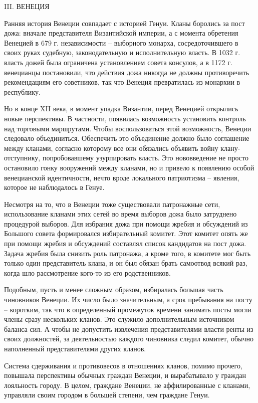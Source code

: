 III. ВЕНЕЦИЯ

Ранняя история Венеции совпадает с историей Генуи. Кланы боролись за пост дожа:
вначале представителя Византийской империи, а с момента обретения Венецией в
679 г. независимости – выборного монарха, сосредоточившего в своих руках
судебную, законодательную и исполнительную власть. В 1032 г. власть дожей была
ограничена установлением совета консулов, а в 1172 г. венецианцы постановили,
что действия дожа никогда не должны противоречить рекомендациям его советников,
так что Венеция превратилась из монархии в республику.

Но в конце XII века, в момент упадка Византии, перед Венецией открылись новые
перспективы. В частности, появилась возможность установить контроль над
торговыми маршрутами. Чтобы воспользоваться этой возможность, Венеции следовало
объединиться. Обеспечить это объединение должно было соглашение между кланами,
согласно которому все они обязались объявить войну клану-отступнику,
попробовавшему узурпировать власть. Это нововведение не просто остановило гонку
вооружений между кланами, но и привело к появлению особой венецианской
идентичности, нечто вроде локального патриотизма – явления, которое не
наблюдалось в Генуе.

Несмотря на то, что в Венеции тоже существовали патронажные сети, использование
кланами этих сетей во время выборов дожа было затруднено процедурой выборов.
Для избрания дожа при помощи жребия и обсуждений из Большого совета
формировался избирательный комитет. Этот комитет опять же при помощи жребия и
обсуждений составлял список кандидатов на пост дожа. Задача жребия была снизить
роль патронажа, а кроме того, в комитете мог быть только один представитель
клана, и он был обязан брать самоотвод всякий раз, когда шло рассмотрение
кого-то из его родственников.

Подобным, пусть и менее сложным образом, избиралась большая часть чиновников
Венеции. Их число было значительным, а срок пребывания на посту – коротким, так
что в определенный промежуток времени занимать посты могли члены сразу
нескольких кланов. Это служило дополнительным источником баланса сил. А чтобы
не допустить извлечения представителями власти ренты из своих должностей, за
деятельностью каждого чиновника следил комитет, обычно наполненный
представителями других кланов.

Система сдерживания и противовесов в отношениях кланов, помимо прочего,
повышала перспективы обычных граждан Венеции, и вырабатывало у граждан
лояльность городу. В целом, граждане Венеции, не аффилированные с кланами,
управляли своим городом в большей степени, чем граждане Генуи.

